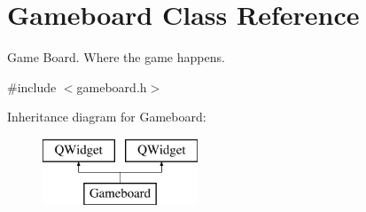 \hypertarget{class_gameboard}{}\section{Gameboard Class Reference}
\label{class_gameboard}


Game Board. Where the game happens.  




{\ttfamily \#include $<$gameboard.\+h$>$}

Inheritance diagram for Gameboard\+:\begin{figure}[H]
\begin{center}
\leavevmode
\includegraphics[height=2.000000cm]{class_gameboard}
\end{center}
\end{figure}

